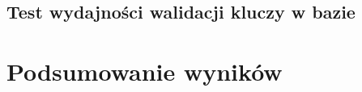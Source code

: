 

\clearpage

\subsection{Test wydajności walidacji kluczy w bazie}


\clearpage

% 
% 

% 
% 

% 
% 

% 
% 

% 
% 

% 
% 

\newpage
\section{Podsumowanie wyników}
